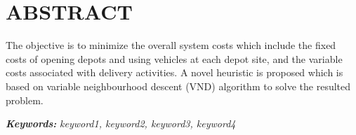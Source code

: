 
 \parbox[1in]{4in}{}

\section*{ABSTRACT} 

\parbox[1in]{2in}{ }


  The objective is to minimize the overall system costs which include the fixed costs of opening depots and using vehicles at each depot site, and the variable costs associated with delivery activities. A novel heuristic is proposed which is based on variable neighbourhood descent (VND) algorithm to solve the resulted problem.


\vspace{5mm} 
\noindent \textbf{\textit{Keywords:} } %
\textit{keyword1, keyword2, keyword3, keyword4}
